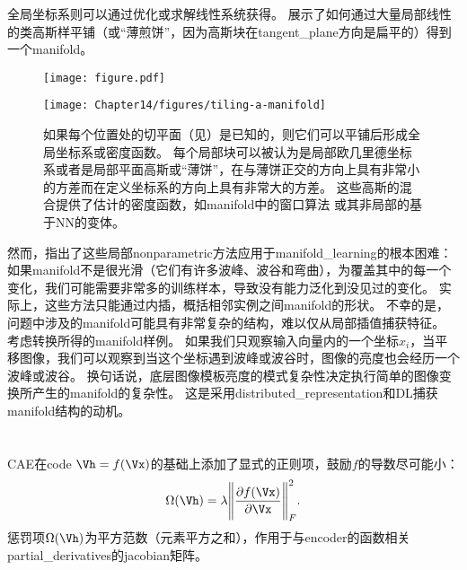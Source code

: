 全局坐标系则可以通过优化或求解线性系统获得。
展示了如何通过大量局部线性的类高斯样平铺（或``薄煎饼''，因为高斯块在\gls{tangent_plane}方向是扁平的）得到一个\gls{manifold}。

\begin{figure}[!htb]
\ifOpenSource
\centerline{\texttt{[image: figure.pdf]}}
\else
\centerline{\texttt{[image: Chapter14/figures/tiling-a-manifold]}}
\fi
\caption{如果每个位置处的切平面（见）是已知的，则它们可以平铺后形成全局坐标系或密度函数。
每个局部块可以被认为是局部欧几里德坐标系或者是局部平面高斯或``薄饼''，在与薄饼正交的方向上具有非常小的方差而在定义坐标系的方向上具有非常大的方差。
这些高斯的混合提供了估计的密度函数，如\gls{manifold}中的窗口算法\citep{Vincent-Bengio-2003-short} 或其非局部的基于\gls{NN}的变体\citep{Bengio-Larochelle-NLMP-NIPS-2006-short}。
}
\label{fig:chap14_tiling-a-manifold}
\end{figure}

然而，\citet{Bengio+Monperrus-2005}指出了这些局部\gls{nonparametric}方法应用于\gls{manifold_learning}的根本困难：如果\gls{manifold}不是很光滑（它们有许多波峰、波谷和弯曲），为覆盖其中的每一个变化，我们可能需要非常多的训练样本，导致没有能力泛化到没见过的变化。
实际上，这些方法只能通过内插，概括相邻实例之间\gls{manifold}的形状。
不幸的是，问题中涉及的\gls{manifold}可能具有非常复杂的结构，难以仅从局部插值捕获特征。
考虑转换所得的\gls{manifold}样例。
如果我们只观察输入向量内的一个坐标$x_i$，当平移图像，我们可以观察到当这个坐标遇到波峰或波谷时，图像的亮度也会经历一个波峰或波谷。
换句话说，底层图像模板亮度的模式复杂性决定执行简单的图像变换所产生的\gls{manifold}的复杂性。
这是采用\gls{distributed_representation}和\gls{DL}捕获\gls{manifold}结构的动机。


\section{}
\label{sec:contractive_autoencoders}
\gls{CAE}\citep{Rifai+al-2011-small,Salah+al-2011-small}在\gls{code} $\Vh = f(\Vx)$的基础上添加了显式的正则项，鼓励$f$的导数尽可能小：
\begin{align}
 \Omega(\Vh) = \lambda \Bigg\| \frac{\partial f(\Vx)}{\partial \Vx} \Bigg\|_F^2 .
\end{align}
惩罚项$\Omega(\Vh)$为平方范数（元素平方之和），作用于与\gls{encoder}的函数相关\gls{partial_derivatives}的\gls{jacobian}矩阵。


